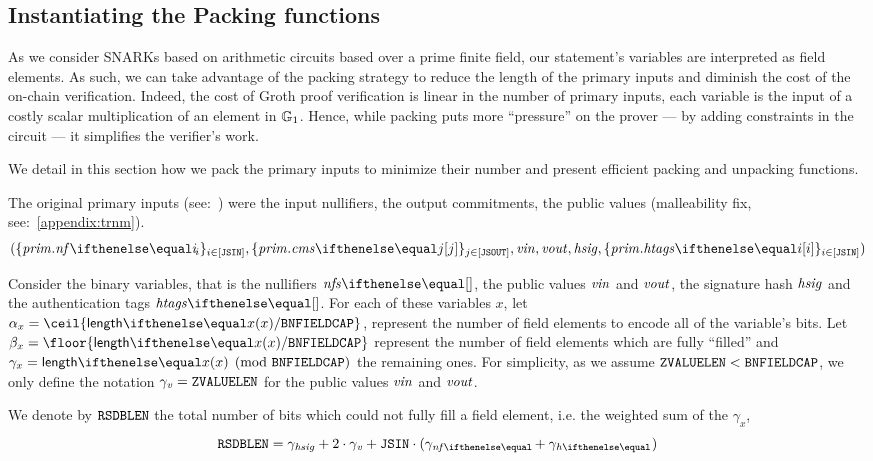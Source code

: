 \subsection{Instantiating the Packing functions}\label{instantiation:statement:pack}
As we consider SNARKs based on arithmetic circuits based over a prime finite field, our statement's variables are interpreted as field elements. As such, we can take advantage of the packing strategy to reduce the length of the primary inputs and diminish the cost of the on-chain verification. Indeed, the cost of Groth proof verification is linear in the number of primary inputs, each variable is the input of a costly scalar multiplication of an element in $\mathbb{G}_1$. Hence, while packing puts more ``pressure'' on the prover --- by adding constraints in the circuit --- it simplifies the verifier's work. 

We detail in this section how we pack the primary inputs to minimize their number and present efficient packing and unpacking functions.

The original primary inputs (see:~\cite[Section 3.4.3]{zethpaper}) were the input nullifiers, the output commitments, the public values  (malleability fix, see:~\cref{appendix:trnm}).
\[
    (\indexedset{\priminputs.\nf{i}}{i \in [\jsin]}, \indexedset{\priminputs.\cms{j}}{j \in [\jsout]}, \vin, \vout, \hsig, \indexedset{\priminputs.\htags{i}}{i \in [\jsin]})
\]

Consider the binary variables, that is the nullifiers $\nfs{}$, the public values $\mathit{vin}$ and $\mathit{vout}$, the signature hash $\mathit{hsig}$ and the authentication tags $\htags{}$. 
For each of these variables $x$, let $\alpha_x=\ceil {\len{x} / \bnFieldBitCap}$, represent the number of field elements to encode all of the variable's bits. Let $\beta_x= \floor{\len{x} / \bnFieldBitCap}$ represent the number of field elements which are fully ``filled'' and $\gamma_x = \len{x} \pmod{\bnFieldBitCap}$ the remaining ones. For simplicity, as we assume $\mathtt{ZVALUELEN}<\mathtt{BNFIELDCAP}$, we only define the notation $\gamma_{\mathit{v}} = \mathtt{ZVALUELEN}$ for the public values $\mathit{vin}$ and $\mathit{vout}$.

We denote by $\mathtt{RSDBLEN}$ the total number of bits which could not fully fill a field element, i.e. the weighted sum of the $\gamma_x$,
\[
    \resBitsBLen = \gamma_\hsig + 2 \cdot \gamma_\notev + \jsin \cdot (\gamma_{\nf{}} + \gamma_{\htag{}} )
\]

